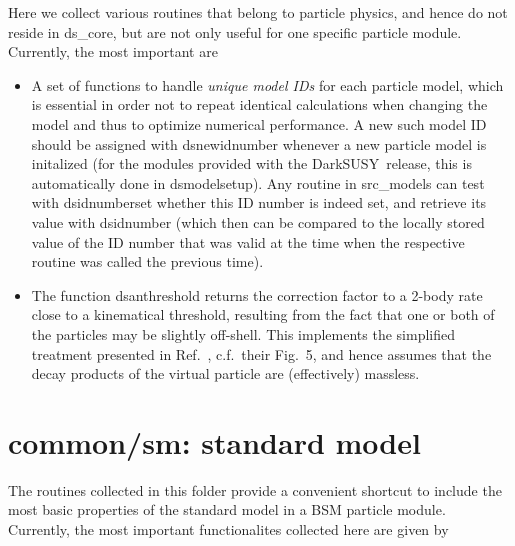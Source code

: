\documentclass[a4paper,10pt,oneside]{book}
\newcommand{\code}[1]{\ft{#1}}
\newcommand{\ds}{{\sffamily DarkSUSY}}
\newcommand{\ft}[1]{\textsf{#1}}
\begin{document}
Here we collect various routines that belong to particle physics, and hence do not reside in \code{ds\_core},
but are not only useful for one specific particle module. Currently, the most important are
\begin{itemize}
\item A set of functions to handle {\it unique model IDs} for each particle model, which is essential
        in order not to repeat identical calculations when changing the model and thus to optimize 
        numerical performance. A new such model 
        ID should be assigned with \code{dsnewidnumber} whenever a new particle model is initalized 
        (for the modules provided with the \ds\ release, this is automatically done in \code{dsmodelsetup}).
        Any routine in \code{src\_models} can test with \code{dsidnumberset} whether this ID number
        is indeed set, and retrieve its value with \code{dsidnumber} (which then can be compared 
        to the locally stored value of the ID number that was valid at the time when the respective routine 
        was called the previous time).
\item The function \code{dsanthreshold} returns the correction factor to a 2-body rate close to a 
         kinematical threshold, resulting from the fact that one or both of the particles may be slightly off-shell.
         This implements the simplified treatment presented in Ref.~\cite{Bringmann:2017sko}, c.f.~their Fig.~5,
         and hence assumes that the decay products of the virtual particle are (effectively) massless.
\end{itemize}


\section{\code{common/sm}: standard model}

The routines collected in this folder provide a convenient shortcut to include the most basic 
properties of the standard model in a BSM particle module. Currently, the most important functionalites
collected here are given by
\end{document}
